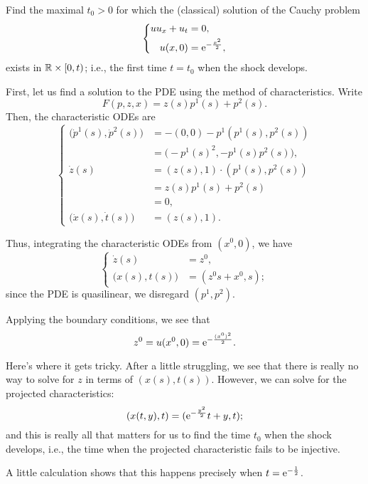 \begin{problem}
  Find the maximal \(t_0>0\) for which the (classical) solution of the
  Cauchy problem
  \[
    \left\{
      \begin{aligned}
        uu_x+u_t&=0,\\
        u(x,0)&=\mathrm{e}^{-\frac{x^2}{2}},
      \end{aligned}
    \right.
  \]
  exists in \(\mathbb{R}\times[0,t)\); i.e., the first time \(t=t_0\) when the
  shock develops.
\end{problem}
\begin{solution*}
  First, let us find a solution to the PDE using the method of
  characteristics. Write
  \[
    F(p,z,x)=z(s)p^1(s)+p^2(s).
  \]
  Then, the characteristic ODEs are
  \[
    \left\{
      \begin{aligned}
        \bigl(\dot p^1(s),\dot p^2(s)\bigr)
        &=-(0,0)-p^1(p^1(s),p^2(s))\\
        &=\bigl(-p^1(s)^2,-p^1(s)p^2(s)\bigr),\\
        \dot z(s)
        &=(z(s),1)\cdot(p^1(s),p^2(s))\\
        &=z(s)p^1(s)+p^2(s)\\
        &=0,\\
        \bigl(\dot x(s),\dot t(s)\bigr)
        &=(z(s),1).
      \end{aligned}
    \right.
  \]

  Thus, integrating the characteristic ODEs from \((x^0,0)\), we have
  \[
    \left\{
      \begin{aligned}
        \dot z(s)
        &=z^0,\\
        \bigl(x(s),t(s)\bigr)
        &=(z^0s+x^0,s);
      \end{aligned}
    \right.
  \]
  since the PDE is quasilinear, we disregard \((p^1,p^2)\).

  Applying the boundary conditions, we see that
  \[
    z^0=u(x^0,0)=\mathrm{e}^{-\frac{(x^0)^2}{2}}.
  \]

  Here's where it gets tricky. After a little struggling, we see that there
  is really no way to solve for \(z\) in terms of \((x(s),t(s))\). However,
  we can solve for the projected characteristics:
  \[
    (x(t,y),t)=(\mathrm{e}^{-\frac{y^2}{2}}t+y,t);
  \]
  and this is really all that matters for us to find the time \(t_0\)  when
  the shock develops, i.e., the time when the projected characteristic
  fails to be injective.

  A little calculation shows that this happens precisely when
  \(t=\mathrm{e}^{-\frac{1}{2}}\).
\end{solution*}

